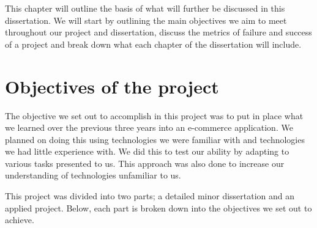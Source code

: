 This chapter will outline the basis of what will further be discussed in this dissertation. We will start by outlining the main objectives we aim to meet throughout our project and dissertation, discuss the metrics of failure and success of a project and break down what each chapter of the dissertation will include.

\section{Objectives of the project}
The objective we set out to accomplish in this project was to put in place what we learned over the previous three years into an e-commerce application. We planned on doing this using technologies we were familiar with and technologies we had little experience with. We did this to test our ability by adapting to various tasks presented to us. This approach was also done to increase our understanding of technologies unfamiliar to us.

This project was divided into two parts; a detailed minor dissertation and an applied project. Below, each part is broken down into the objectives we set out to achieve. 


